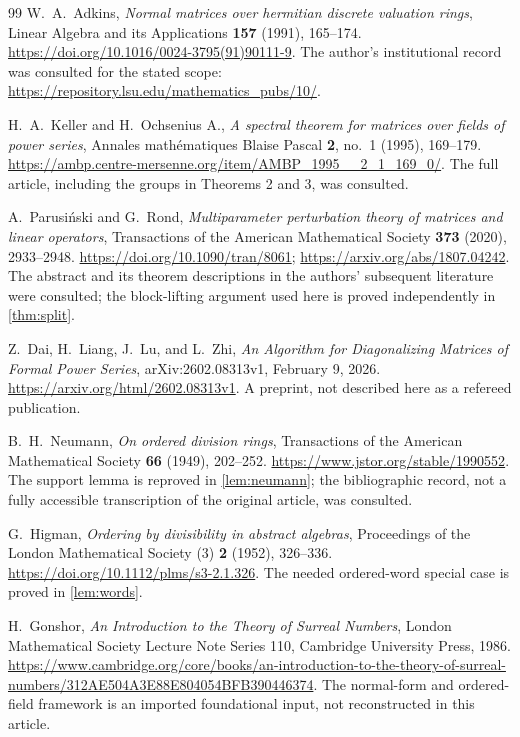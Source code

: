 \documentclass[11pt,letterpaper]{article}
\numberwithin{equation}{section}
\theoremstyle{definition}
\theoremstyle{remark}
\begin{document}
\begin{thebibliography}{99}
W.~A.~Adkins,
\emph{Normal matrices over hermitian discrete valuation rings},
Linear Algebra and its Applications \textbf{157} (1991), 165--174.
\url{https://doi.org/10.1016/0024-3795(91)90111-9}.
The author's institutional record was consulted for the stated scope:
\url{https://repository.lsu.edu/mathematics_pubs/10/}.

H.~A.~Keller and H.~Ochsenius A.,
\emph{A spectral theorem for matrices over fields of power series},
Annales math\'ematiques Blaise Pascal \textbf{2}, no.~1 (1995), 169--179.
\url{https://ambp.centre-mersenne.org/item/AMBP_1995__2_1_169_0/}.
The full article, including the groups in Theorems 2 and 3, was consulted.

A.~Parusi\'nski and G.~Rond,
\emph{Multiparameter perturbation theory of matrices and linear operators},
Transactions of the American Mathematical Society \textbf{373} (2020),
2933--2948.
\url{https://doi.org/10.1090/tran/8061};
\url{https://arxiv.org/abs/1807.04242}.
The abstract and its theorem descriptions in the authors' subsequent
literature were consulted; the block-lifting argument used here is proved
independently in \cref{thm:split}.

Z.~Dai, H.~Liang, J.~Lu, and L.~Zhi,
\emph{An Algorithm for Diagonalizing Matrices of Formal Power Series},
arXiv:2602.08313v1, February 9, 2026.
\url{https://arxiv.org/html/2602.08313v1}.
A preprint, not described here as a refereed publication.

B.~H.~Neumann,
\emph{On ordered division rings},
Transactions of the American Mathematical Society \textbf{66} (1949),
202--252.
\url{https://www.jstor.org/stable/1990552}.
The support lemma is reproved in \cref{lem:neumann}; the bibliographic record,
not a fully accessible transcription of the original article, was consulted.

G.~Higman,
\emph{Ordering by divisibility in abstract algebras},
Proceedings of the London Mathematical Society (3) \textbf{2} (1952), 326--336.
\url{https://doi.org/10.1112/plms/s3-2.1.326}.
The needed ordered-word special case is proved in \cref{lem:words}.

H.~Gonshor,
\emph{An Introduction to the Theory of Surreal Numbers},
London Mathematical Society Lecture Note Series 110,
Cambridge University Press, 1986.
\url{https://www.cambridge.org/core/books/an-introduction-to-the-theory-of-surreal-numbers/312AE504A3E88E804054BFB390446374}.
The normal-form and ordered-field framework is an imported foundational input,
not reconstructed in this article.


\end{thebibliography}
\end{document}
